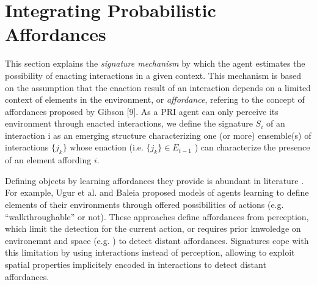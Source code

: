 \documentclass[conference]{IEEEtran}
\begin{document}
\section{Integrating Probabilistic Affordances}\label{signatures}


This section explains the \textit{signature mechanism} \cite{gay:space} by which the agent estimates the possibility of enacting interactions in a given context.
This mechanism is based on the assumption that the enaction result of an interaction depends on a limited context of elements in the environment, or \textit{affordance}, refering to the concept of affordances proposed by Gibson [9]. %
As a PRI agent can only perceive its environment through enacted interactions, we define the signature $S_i$ of an interaction i as an emerging structure characterizing one
(or more) ensemble(s) of interactions $\{j_k\}$ whose enaction (i.e. $\{j_k\} \in E_{t-1}$ ) can characterize the presence of an element affording $i$.

Defining objects by learning affordances they provide is abundant in literature \cite{paola:affordance}.
For example, Ugur et al. \cite{ugur:traversability} and Baleia \cite{baleia:affordance} proposed models of agents learning to define elements of their environments through offered possibilities of actions (e.g. ``walkthroughable'' or not). These approaches define affordances from perception, which limit the detection for the current action, or requires prior knwoledge on environemnt and space (e.g. \cite{manoury:affordance}) to detect distant affordances. Signatures cope with this limitation by using interactions instead of perception, allowing to exploit spatial properties implicitely encoded in interactions to detect distant affordances.
\end{document}
